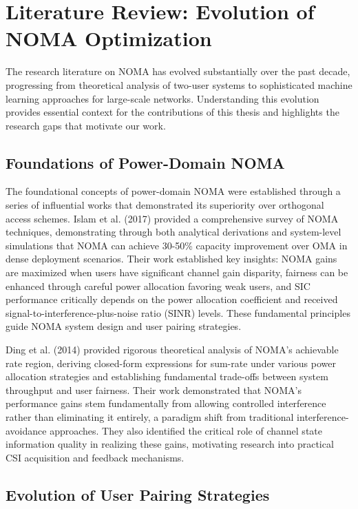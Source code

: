 \section{Literature Review: Evolution of NOMA Optimization}

The research literature on NOMA has evolved substantially over the past decade, progressing from theoretical analysis of two-user systems to sophisticated machine learning approaches for large-scale networks. Understanding this evolution provides essential context for the contributions of this thesis and highlights the research gaps that motivate our work.

\subsection{Foundations of Power-Domain NOMA}

The foundational concepts of power-domain NOMA were established through a series of influential works that demonstrated its superiority over orthogonal access schemes. Islam et al. (2017) provided a comprehensive survey of NOMA techniques, demonstrating through both analytical derivations and system-level simulations that NOMA can achieve 30-50\% capacity improvement over OMA in dense deployment scenarios. Their work established key insights: NOMA gains are maximized when users have significant channel gain disparity, fairness can be enhanced through careful power allocation favoring weak users, and SIC performance critically depends on the power allocation coefficient and received signal-to-interference-plus-noise ratio (SINR) levels. These fundamental principles guide NOMA system design and user pairing strategies.

Ding et al. (2014) provided rigorous theoretical analysis of NOMA's achievable rate region, deriving closed-form expressions for sum-rate under various power allocation strategies and establishing fundamental trade-offs between system throughput and user fairness. Their work demonstrated that NOMA's performance gains stem fundamentally from allowing controlled interference rather than eliminating it entirely, a paradigm shift from traditional interference-avoidance approaches. They also identified the critical role of channel state information quality in realizing these gains, motivating research into practical CSI acquisition and feedback mechanisms.

\subsection{Evolution of User Pairing Strategies}

